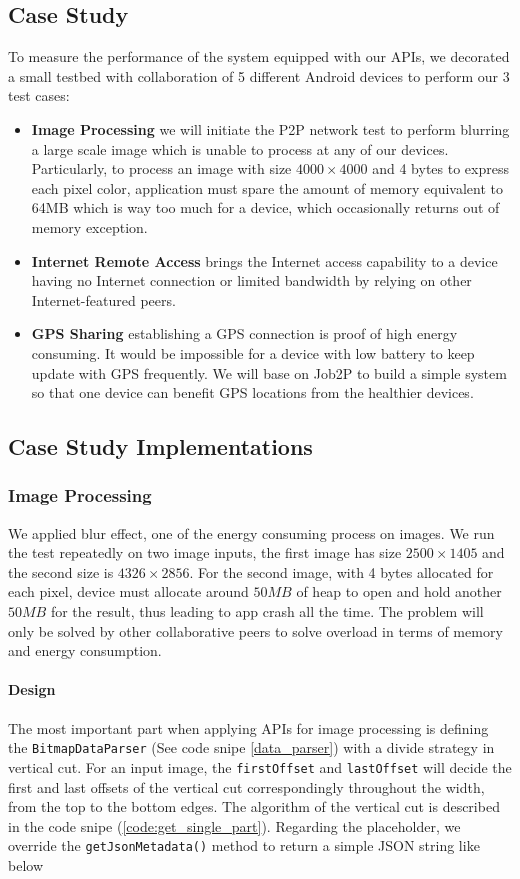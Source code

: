 \documentclass[conference]{IEEEtran}
\begin{document}
\subsection{Case Study}
To measure the performance of the system equipped with our APIs, we decorated a small testbed with collaboration of 5 different Android devices to perform our 3 test cases:
\begin{itemize}
	\item \textbf{Image Processing} we will initiate the P2P network test to perform blurring a large scale image which is unable to process at any of our devices. Particularly, to process an image with size $4000 \times 4000$ and 4 bytes to express each pixel color, application must spare the amount of memory equivalent to 64MB which is way too much for a device, which occasionally returns out of memory exception.
	\item \textbf{Internet Remote Access} brings the Internet access capability to a device having no Internet connection or limited bandwidth by relying on other Internet-featured peers.
	\item \textbf{GPS Sharing} establishing a GPS connection is proof of high energy consuming. It would be impossible for a device with low battery to keep update with GPS frequently. We will base on Job2P to build a simple system so that one device can benefit GPS locations from the healthier devices.
\end{itemize}

\subsection{Case Study Implementations}

\subsubsection{Image Processing}
We applied blur effect, one of the energy consuming process on images. We run the test repeatedly on two image inputs, the first image has size $2500 \times 1405$ and the second size is $4326 \times 2856$. For the second image, with 4 bytes allocated for each pixel, device must allocate around $50MB$ of heap to open and hold another $50MB$ for the result, thus leading to app crash all the time. The problem will only be solved by other collaborative peers to solve overload in terms of memory and energy consumption.

\paragraph{Design}
The most important part when applying APIs for image processing is defining the \texttt{BitmapDataParser} (See code snipe \ref{data_parser}) with a divide strategy in vertical cut. For an input image, the \texttt{firstOffset} and \texttt{lastOffset} will decide the first and last offsets of the vertical cut correspondingly throughout the width, from the top to the bottom edges. The algorithm of the vertical cut is described in the code snipe (\ref{code:get_single_part}). Regarding the placeholder, we override the \texttt{getJsonMetadata()} method to return a simple JSON string like below\\
\end{document}

